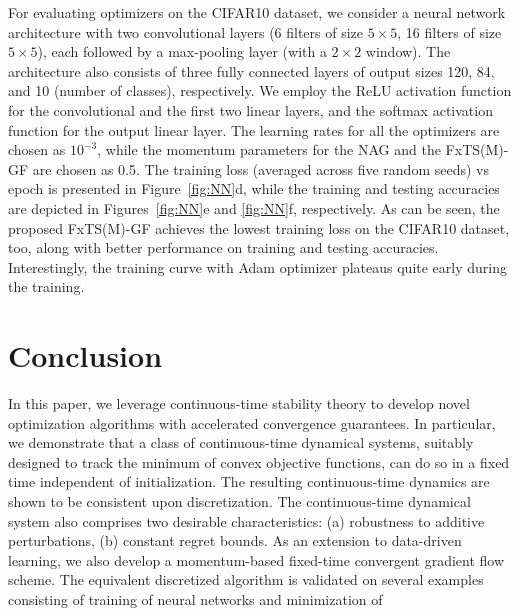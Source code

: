 \documentclass[letterpaper]{article}
\begin{document}
For evaluating optimizers on the CIFAR10 dataset, we consider a neural network architecture with two convolutional layers (6 filters of size $5\times5$, 16 filters of size $5\times5$), each followed by a max-pooling layer (with a $2\times 2$ window). The architecture also consists of three fully connected layers of output sizes 120, 84, and 10 (number of classes), respectively. We employ the ReLU activation function for the convolutional and the first two linear layers, and the softmax activation function for the output linear layer. The learning rates for all the optimizers are chosen as $10^{-3}$, while the momentum parameters for the NAG and the FxTS(M)-GF are chosen as 0.5. The training loss (averaged across five random seeds) vs epoch is presented in Figure~\ref{fig:NN}d, while the training and testing accuracies are depicted in Figures~\ref{fig:NN}e and \ref{fig:NN}f, respectively. As can be seen, the proposed FxTS(M)-GF achieves the lowest training loss on the CIFAR10 dataset, too, along with better performance on training and testing accuracies. Interestingly, the training curve with Adam optimizer plateaus quite early during the training.%

\section{Conclusion} \label{sec: conclusion}
In this paper, we leverage continuous-time stability theory to develop novel optimization algorithms with accelerated convergence guarantees. In particular, we demonstrate that a class of continuous-time dynamical systems, suitably designed to track the minimum of convex objective functions, can do so in a fixed time independent of initialization. The resulting continuous-time dynamics are shown to be consistent upon discretization. The continuous-time dynamical system also comprises two desirable characteristics: (a) robustness to additive perturbations, (b) constant regret bounds. As an extension to data-driven learning, we also develop a momentum-based fixed-time convergent gradient flow scheme. The equivalent discretized algorithm is validated on several examples consisting of training of neural networks and minimization of

\pagebreak

\clearpage

\end{document}
